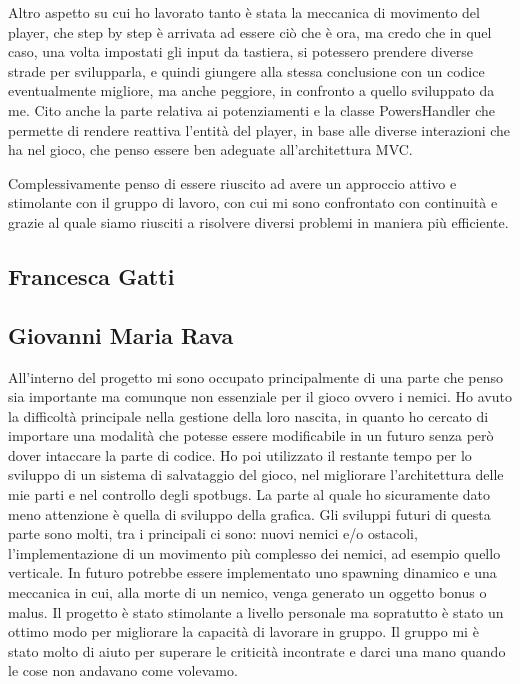 \documentclass[a4paper,12pt]{report}
\begin{document}
Altro aspetto su cui ho lavorato tanto è stata la meccanica di movimento del player, che step by step è arrivata ad essere ciò che è 
ora, ma credo che in quel caso, una volta impostati gli input da tastiera, si potessero prendere diverse strade per svilupparla, 
e quindi giungere alla stessa conclusione con un codice eventualmente migliore, ma anche peggiore, in confronto a quello sviluppato da me.
Cito anche la parte relativa ai potenziamenti e la classe PowersHandler che permette di rendere reattiva l'entità del player, 
in base alle diverse interazioni che ha nel gioco, che penso essere ben adeguate all'architettura MVC.

Complessivamente penso di essere riuscito ad avere un approccio attivo e stimolante con il gruppo di lavoro, con cui mi sono confrontato 
con continuità e grazie al quale siamo riusciti a risolvere diversi problemi in maniera più efficiente.


\subsection{Francesca Gatti}
\subsection{Giovanni Maria Rava}
All'interno del progetto mi sono occupato principalmente di una parte che penso sia importante ma comunque non essenziale per il 
gioco ovvero i nemici. Ho avuto la difficoltà principale nella gestione della loro nascita, in quanto ho cercato di importare una
modalità che potesse essere modificabile in un futuro senza però dover intaccare la parte di codice. Ho poi utilizzato il restante 
tempo per lo sviluppo di un sistema di salvataggio del gioco, nel migliorare l’architettura delle mie parti e nel controllo degli 
spotbugs. La parte al quale ho sicuramente dato meno attenzione è quella di sviluppo della grafica. Gli sviluppi futuri di questa 
parte sono molti, tra i principali  ci sono: nuovi nemici e/o ostacoli, l’implementazione di un movimento più complesso dei nemici,
ad esempio quello verticale. In futuro potrebbe essere implementato uno spawning dinamico e una meccanica in cui, alla morte di un 
nemico, venga generato un oggetto bonus o malus.
Il progetto è stato stimolante a livello personale ma sopratutto è stato un ottimo modo per migliorare la capacità di lavorare in 
gruppo. Il gruppo mi è stato molto di aiuto per superare le criticità incontrate e darci una mano quando le cose non andavano come 
volevamo.
\appendix
\end{document}
